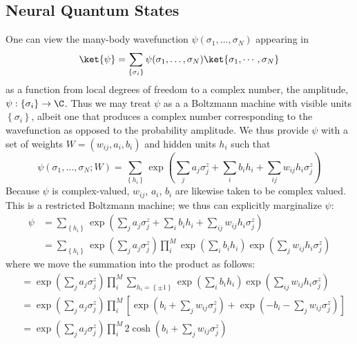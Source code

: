 \documentclass{report}
\begin{document}
\subsection{Neural Quantum States}
One can view the many-body wavefunction $ \psi(\sigma_1, \dots, \sigma_N) $ 
appearing in 
\begin{equation*}
	\ket{\psi} = \sum_{\left\{\sigma_i\right\}} \psi(\sigma_1, \dots,\sigma_N)
		\ket{\sigma_1,\cdots, \sigma_N }
\end{equation*}
as a function from local degrees of freedom to a complex number, the amplitude, 
$ \psi : \left\{\sigma_i\right\} \to \C $. Thus we may treat $ \psi $ as a 
a Boltzmann machine with visible units $ \left\{\sigma_i\right\} $, albeit 
one that produces a complex number corresponding to the wavefunction as opposed 
to the probability amplitude. We thus provide $ \psi $ with a set of weights 
$ W = (w_{ij}, a_i, b_i)$ and hidden units $ h_i $ such that 
\begin{equation*}
	\psi(\sigma_1, \dots, \sigma_N; W)
		= \sum_{\left\{h_i\right\}}
			\exp\left(\sum_j a_j \sigma_j^z + \sum_i b_i h_i 
					+\sum_{ij} w_{ij} h_i \sigma_j^z \right)
\end{equation*}
Because $ \psi $ is complex-valued, $ w_{ij} $, $ a_i $, $ b_i $ are likewise 
taken to be complex valued. This is a restricted Boltzmann machine; we thus 
can explicitly marginalize $ \psi $:
\begin{align*}
	\psi 
		&= \sum_{\left\{ h_i \right\}}
			\exp\left(\sum_j a_j \sigma_j^z + \sum_i b_i h_i 
					+\sum_{ij} w_{ij} h_i \sigma_j^z \right)\\
	    &= \sum_{\left\{ h_i \right\}}
			\exp\left(\sum_j a_j \sigma_j^z\right) 
			\prod_i^M \exp\left(\sum_i b_i h_i\right) 
						\exp\left(\sum_j w_{ij} h_i \sigma_j^z\right)
\end{align*}
where we move the summation into the product as follows: 
\begin{align*}
	&= \exp \left( \sum_j a_j \sigma_j^z \right)
		\prod_i^M \sum_{h_i = \left\{ \pm 1 \right\}} 
			\exp\left(\sum_i b_i h_i\right)
			\exp\left(\sum_{ij} w_{ij} h_i \sigma_j^z\right) 
	\\ 
	&= \exp\left(\sum_j a_j \sigma_j^z \right)
	\prod_i^M \left[
		\exp\left(b_i + \sum_j w_{ij} \sigma_j^z \right)
		+ \exp\left(-b_i - \sum_j w_{ij} \sigma_j^z \right)
	\right]
	\\
	&= \exp\left(\sum_j a_j \sigma_j^z \right)
		\prod_i^M 2\cosh\left(b_i +\sum_{j} w_{ij} \sigma_j^z\right)
\end{align*}
\end{document}
